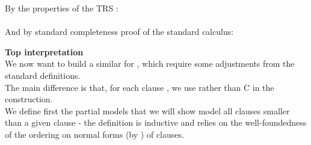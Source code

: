 \bigskip 

\noindent
By the properties of the TRS :\\
\\
And by standard completeness proof of the standard calculus:\\

\bigskip 

\noindent
\textbf{Top interpretation}\\
We now want to build a similar  for , which require some adjustments from the standard definitions.\\
The main difference is that, for each clause , we use  rather than C in the construction.\\
We define first the partial models that we will show model all clauses smaller than a given clause - the definition is inductive and relies on the well-foundedness of the ordering \m{\prec} on normal forms (by ) of clauses.

